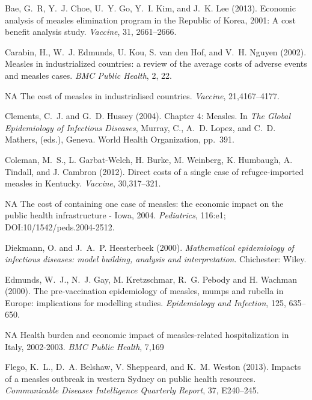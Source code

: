 \documentclass{article}
\begin{document}
{\begin{thebibliography}{}
Bae, G.~R, Y.~J. Choe, U.~Y. Go, Y.~I. Kim, and J.~K. Lee (2013). 
\newblock Economic analysis of measles elimination program in the Republic of Korea, 2001: A cost benefit analysis study.
\newblock \emph {Vaccine}, 31, 2661--2666.

Carabin, H., W.~J. Edmunds, U. Kou, S. van den Hof, and V.~H. Nguyen (2002). 
\newblock Measles in industrialized countries: a review of the average costs of adverse events and measles cases.
\newblock \emph{BMC Public Health}, 2, 22.

NA
\newblock The cost of measles in industrialised countries.
\newblock \emph{Vaccine}, 21,4167--4177.

Clements, C.~J. and G.~D. Hussey (2004).
\newblock Chapter 4: Measles.
\newblock In \emph{The Global Epidemiology of Infectious Diseases},  Murray, C., A.~D. Lopez, and C.~D. Mathers, (eds.), Geneva.
  World Health Organization, pp.~391.

Coleman, M.~S., L. Garbat-Welch, H. Burke, M. Weinberg, K. Humbaugh, A. Tindall, and J. Cambron (2012).
\newblock Direct costs of a single case of refugee-imported measles in Kentucky.
\newblock \emph{Vaccine}, 30,317--321.

NA
\newblock The cost of containing one case of measles: the economic impact on the public health infrastructure - Iowa, 2004.
\newblock \emph{Pediatrics}, 116:e1; DOI:10/1542/peds.2004-2512.

Diekmann, O. and  J.~A.~P. Heesterbeek (2000).
\newblock \emph{Mathematical epidemiology of infectious diseases: model building, analysis and interpretation}.
Chichester: Wiley.

Edmunds, W.~J., N.~J. Gay, M. Kretzschmar, R.~G. Pebody and H. Wachman (2000).
\newblock The pre-vaccination epidemiology of measles, mumps and rubella in Europe: implications for modelling studies.
\newblock \emph{Epidemiology and Infection}, 125, 635--650.

NA
\newblock Health burden and economic impact of measles-related hospitalization in Italy, 2002-2003.
\newblock \emph{BMC Public Health}, 7,169

Flego, K.~L., D.~A. Belshaw, V. Sheppeard, and K.~M. Weston (2013).
\newblock Impacts of a measles outbreak in western Sydney on public health resources.
\newblock \emph{Communicable Diseases Intelligence Quarterly Report}, 37, E240--245.


\end{thebibliography}}
\end{document}

